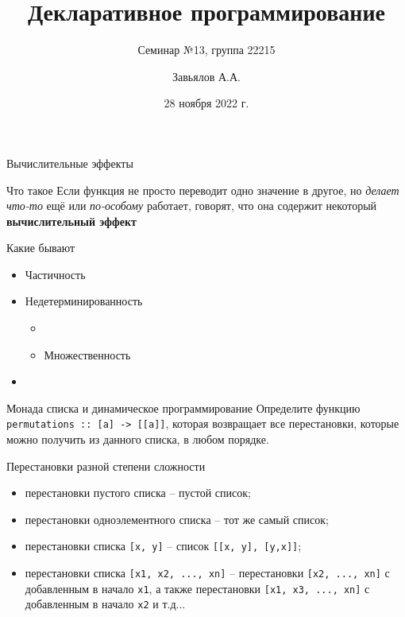 \documentclass{beamer}
\title{Декларативное программирование}
\subtitle{Семинар №13, группа 22215}
\author{Завьялов А.А.}
\date{28 ноября 2022 г.}
\institute{Кафедра систем информатики ФИТ НГУ}
\newcommand{\hs}[1]{\texttt{#1}}
\begin{document}
  \maketitle
\begin{frame}{Вычислительные эффекты}
   \begin{block}{Что такое}
   \vspace{2px}
      Если функция не просто переводит одно значение в другое, но \textit{делает что-то} ещё
      или \textit{по-особому} работает, говорят, что она содержит некоторый \textbf{вычислительный эффект}
   \end{block}
   \begin{block}{Какие бывают}
    \begin{itemize}
        \item Частичность 
        \item Недетерминированность
          \begin{itemize}
              \item {}
              \item Множественность 
          \end{itemize}
        \item {}
    \end{itemize}
    \end{block}
\end{frame}
\begin{frame}{Монада списка и динамическое программирование}
    Определите функцию \hs{permutations :: [a] -> [[a]]}, которая возвращает все перестановки, которые можно получить из данного списка, в любом порядке.
    \pause
    \begin{block}{Перестановки разной степени сложности}
     \begin{itemize}
         \item перестановки пустого списка -- пустой список;
         \item перестановки одноэлементного списка -- тот же самый список;
         \item перестановки списка \hs{[x, y]} -- список \hs{[[x, y], [y,x]]};
         \item перестановки списка \hs{[x1, x2, ..., xn]} -- перестановки \hs{[x2, ..., xn]} с добавленным в начало \hs{x1}, а также перестановки \hs{[x1, x3, ..., xn]} с добавленным в начало \hs{x2} и т.д...
     \end{itemize}
    \end{block}
\end{frame}
\end{document}
